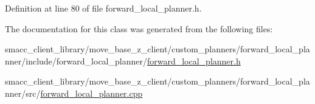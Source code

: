 Definition at line 80 of file forward\+\_\+local\+\_\+planner.\+h.



The documentation for this class was generated from the following files\+:\begin{DoxyCompactItemize}
\item 
smacc\+\_\+client\+\_\+library/move\+\_\+base\+\_\+z\+\_\+client/custom\+\_\+planners/forward\+\_\+local\+\_\+planner/include/forward\+\_\+local\+\_\+planner/\hyperlink{forward__local__planner_2include_2forward__local__planner_2forward__local__planner_8h}{forward\+\_\+local\+\_\+planner.\+h}\item 
smacc\+\_\+client\+\_\+library/move\+\_\+base\+\_\+z\+\_\+client/custom\+\_\+planners/forward\+\_\+local\+\_\+planner/src/\hyperlink{forward__local__planner_8cpp}{forward\+\_\+local\+\_\+planner.\+cpp}\end{DoxyCompactItemize}
